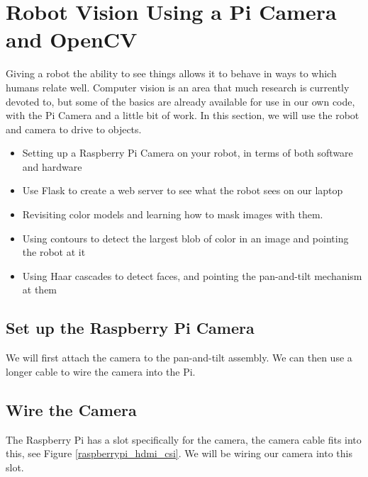 \section{Robot Vision Using a Pi Camera and OpenCV}
\label{robot_vision_using_pi_camera_opencv}

Giving a robot the ability to see things allows it to behave in ways to which humans relate
well. Computer vision is an area that much research is currently devoted to, but some of the
basics are already available for use in our own code, with the Pi Camera and a little bit of
work. In this section, we will use the robot and camera to drive to objects.

\begin{itemize}
\item Setting up a Raspberry Pi Camera on your robot, in terms of both software and hardware
\item Use Flask to create a web server to see what the robot sees on our laptop
\item Revisiting color models and learning how to mask images with them.
\item Using contours to detect the largest blob of color in an image and pointing the robot at it
\item Using Haar cascades to detect faces, and pointing the pan-and-tilt mechanism at them
\end{itemize}

\subsection{Set up the Raspberry Pi Camera}
We will first attach the camera to the pan-and-tilt assembly. We can then use a longer cable
to wire the camera into the Pi.

\subsection{Wire the Camera}
\label{wire_the_camera}

The Raspberry Pi has a slot specifically for the camera, the camera cable fits into this, see Figure \ref{raspberrypi_hdmi_csi}. We will be wiring our camera into this slot.

